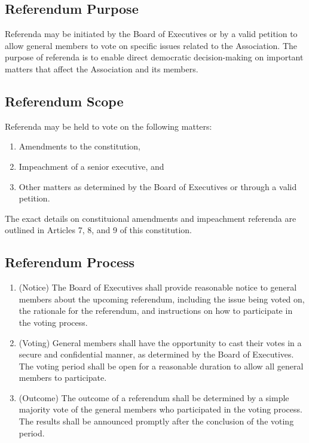 \subsection{Referendum Purpose}
Referenda may be initiated by the Board of Executives or by a valid
petition to allow general members to vote on specific issues related
to the Association. The purpose of referenda is to enable direct
democratic decision-making on important matters that affect the
Association and its members.

\subsection{Referendum Scope}
Referenda may be held to vote on the following matters:
\begin{enumerate}

    \item Amendments to the constitution,

    \item Impeachment of a senior executive, and

    \item Other matters as determined by the Board of Executives 
    or through a valid petition.
\end{enumerate}
The exact details on constituional amendments and impeachment referenda 
are outlined in Articles 7, 8, and 9 of this constitution.

\subsection{Referendum Process}\label{referendum-process}
\begin{enumerate}

    \item (Notice) The Board of Executives shall provide reasonable
    notice to general members about the upcoming referendum, including
    the issue being voted on, the rationale for the referendum, and 
    instructions on how to participate in the voting process.

    \item (Voting) General members shall have the opportunity to cast
    their votes in a secure and confidential manner, as determined by
    the Board of Executives. The voting period shall be open for a
    reasonable duration to allow all general members to participate.

    \item (Outcome) The outcome of a referendum shall be determined by
    a simple majority vote of the general members who participated in
    the voting process. The results shall be announced promptly after
    the conclusion of the voting period.

\end{enumerate}